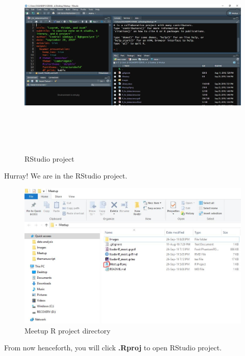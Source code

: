 \documentclass[
  ignorenonframetext,
]{beamer}
\begin{document}
\begin{frame}{}
\protect\hypertarget{section-4}{}

\begin{figure}
\centering
\includegraphics[height=10cm]{Images/step3.JPG}
\caption{RStudio project}
\end{figure}
Hurray! We are in the RStudio project.
\end{frame}

\begin{frame}{}
\protect\hypertarget{section-5}{}

\begin{figure}
\centering
\includegraphics[height=7cm]{Images/step4.JPG}
\caption{Meetup R project directory}
\end{figure}
From now henceforth, you will click \textbf{.Rproj} to open RStudio project.
\end{frame}
\end{document}
